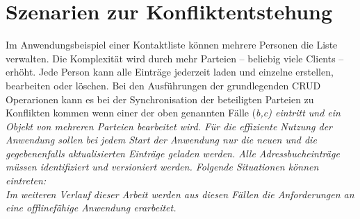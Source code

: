 \section{\label{sec:konfliktszenarien}Szenarien zur Konfliktentstehung}
Im Anwendungsbeispiel einer Kontaktliste können mehrere Personen die Liste verwalten. Die Komplexität wird durch mehr Parteien -- beliebig viele Clients -- erhöht.
Jede Person kann alle Einträge jederzeit laden und einzelne erstellen, bearbeiten oder löschen. Bei den Ausführungen der grundlegenden \gls{CRUD} Operarionen kann es bei der Synchronisation der beteiligten Parteien zu Konflikten kommen wenn einer der oben genannten Fälle (\it{b,c}) eintritt und ein Objekt von mehreren Parteien bearbeitet wird.
Für die effiziente Nutzung der Anwendung sollen bei jedem Start der Anwendung nur die neuen und die gegebenenfalls aktualisierten Einträge geladen werden. Alle Adressbucheinträge müssen identifiziert und versioniert werden. Folgende Situationen können eintreten:
%
\\
%
Im weiteren Verlauf dieser Arbeit werden aus diesen Fällen die Anforderungen an eine offlinefähige Anwendung erarbeitet.